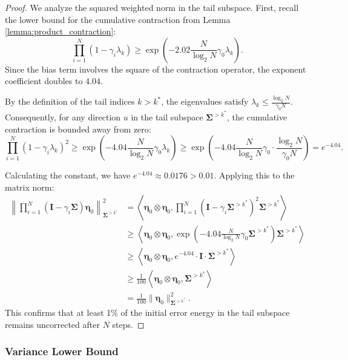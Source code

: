 \documentclass{article}
\theoremstyle{definition}
\theoremstyle{definition}
\theoremstyle{plain}
\theoremstyle{plain}
\theoremstyle{plain}
\theoremstyle{plain}
\theoremstyle{plain}
\newcommand{\bs}[1]{\boldsymbol{\mathbf{#1}}}
\newcommand{\Sig}{\mathbf{\Sigma}}
\newcommand{\id}{\mathbf{I}}
\newcommand{\nm}[2][]{\left\| #2 \right\|^2_{#1}}
\newcommand{\inner}[1]{\left\langle#1\right\rangle}
\begin{document}
\begin{proof}
    We analyze the squared weighted norm in the tail subspace.
    First, recall the lower bound for the cumulative contraction from Lemma \ref{lemma:product_contraction}:
    \[ \prod_{i=1}^N (1-\gamma_i \lambda_k) \geq \exp\left( -2.02 \frac{N}{\log_2 N} \gamma_0 \lambda_k \right). \]
    Since the bias term involves the square of the contraction operator, the exponent coefficient doubles to $4.04$.
    
    By the definition of the tail indices $k > k^*$, the eigenvalues satisfy $\lambda_k \le \frac{\log_2 N}{\gamma_0 N}$. Consequently, for any direction $u$ in the tail subspace $\bs\Sigma^{>k^*}$, the cumulative contraction is bounded away from zero:
    \begin{equation}
        \prod_{i=1}^N (1-\gamma_i \lambda_k)^2 \geq \exp\left( -4.04 \frac{N}{\log_2 N} \gamma_0 \lambda_k \right) \geq \exp\left( -4.04 \frac{N}{\log_2 N} \gamma_0 \cdot \frac{\log_2 N}{\gamma_0 N} \right) = e^{-4.04}.
    \end{equation}
    
    Calculating the constant, we have $e^{-4.04} \approx 0.0176 > 0.01$. Applying this to the matrix norm:
    \begin{equation}
    \begin{aligned}
        \nm[\Sig^{> k^*}]{\prod_{i=1}^N(\id-\gamma_i\bs\Sigma)\bs\eta_0} &= \inner{\bs\eta_0\otimes\bs\eta_0,\prod_{i=1}^N(\id-\gamma_i\bs\Sigma^{> k^*})^2\bs\Sigma^{> k^*}}\\
        &\geq \inner{\bs\eta_0\otimes\bs\eta_0, \exp\left(-4.04\frac{N}{\log_2 N}\gamma_0\bs\Sigma^{>k^*}\right) \bs\Sigma^{> k^*}} \\
        &\geq \inner{\bs\eta_0\otimes\bs\eta_0, e^{-4.04}\cdot \id \cdot \bs\Sigma^{> k^*}}\\
        &\geq \frac{1}{100} \inner{\bs\eta_0\otimes\bs\eta_0, \bs\Sigma^{> k^*}}\\
        &= \frac{1}{100} \|\bs\eta_0\|^2_{\Sig^{> k^*}}.
    \end{aligned}
    \end{equation}
    This confirms that at least 1\% of the initial error energy in the tail subspace remains uncorrected after $N$ steps.
\end{proof}


\subsubsection{Variance Lower Bound}
\label{subsubsec:variance_lower_bound}
\end{document}
